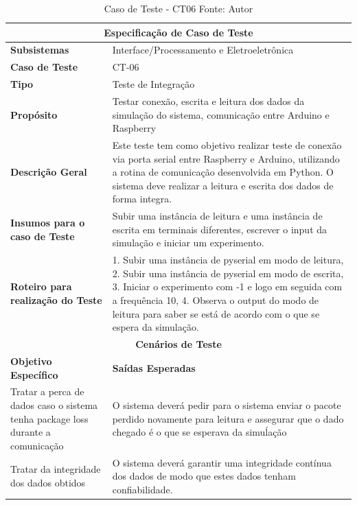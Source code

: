 \begin{table}[H]
    \begin{center}
        \begin{tabular}{|p{5cm}|p{12cm}|}
            \hline
            \multicolumn{2}{|c|}{\textbf{Especificação de Caso de Teste}} \\ \hline
                \textbf{Subsistemas}                               & Interface/Processamento e Eletroeletrônica \\ \hline
                \textbf{Caso de Teste}                             & CT-06 \\ \hline
                \textbf{Tipo}                                             & Teste de Integração \\ \hline
                \textbf{Propósito}                                     & Testar conexão, escrita e leitura dos dados da simulação do sistema, comunicação entre Arduino e Raspberry \\ \hline
                \textbf{Descrição Geral}                           & Este teste tem como objetivo realizar teste de conexão via porta serial entre Raspberry e Arduino, utilizando a rotina de comunicação desenvolvida em Python. O sistema deve realizar a leitura e escrita dos dados de forma integra. \\ \hline
                \textbf{Insumos para o caso de Teste}    & Subir uma instância de leitura e uma instância de escrita em terminais diferentes, escrever o input da simulação e iniciar um experimento. \\ \hline
                \textbf{Roteiro para realização do Teste}&  1. Subir uma instância de pyserial em modo de leitura, 2. Subir uma instância de pyserial em modo de escrita, 3. Iniciar o experimento com -1 e logo em seguida com a frequência 10, 4. Observa o output do modo de leitura para saber se está de acordo com o que se espera da simulação. \\ \hline
            \multicolumn{2}{|c|}{\textbf{Cenários de Teste}} \\ \hline
                \textbf{Objetivo Específico}                      & \textbf{Saídas Esperadas} \\ \hline
                Tratar a perca de dados caso o sistema tenha package loss durante a comunicação & O sistema deverá pedir para o sistema enviar o pacote perdido novamente para leitura e assegurar que o dado chegado é o que se esperava da simuĺação \\ \hline
                Tratar da integridade dos dados obtidos  & O sistema deverá garantir uma integridade contínua dos dados de modo que estes dados tenham confiabilidade. \\ \hline
        \end{tabular}
    \end{center}
    \caption[Caso de Teste - CT06]{Caso de Teste - CT06
    \protect Fonte: Autor}
    \label{CT-06}
\end{table}

